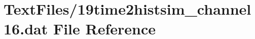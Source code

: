 \hypertarget{19time2histsim__channel16_8dat}{}\section{Text\+Files/19time2histsim\+\_\+channel16.dat File Reference}
\label{19time2histsim__channel16_8dat}
